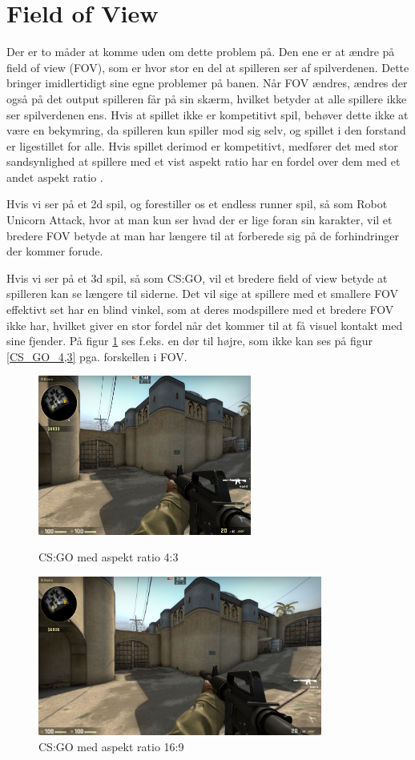 \documentclass[Main.tex]{AspectRatio.tex}
\begin{document}
\section{Field of View}

Der er to måder at komme uden om dette problem på. Den ene er at ændre på field of view (FOV), som er hvor stor en del at spilleren ser af spilverdenen. Dette bringer imidlertidigt sine egne problemer på banen. Når FOV ændres, ændres der også på det output spilleren får på sin skærm, hvilket betyder at alle spillere ikke ser spilverdenen ens. Hvis at spillet ikke er kompetitivt spil, behøver dette ikke at være en bekymring, da spilleren kun spiller mod sig selv, og spillet i den forstand er ligestillet for alle. Hvis spillet derimod er kompetitivt, medfører det med stor sandsynlighed at spillere med et vist aspekt ratio har en fordel over dem med et andet aspekt ratio \cite{Atwood}.

Hvis vi ser på et 2d spil, og forestiller os et endless runner spil, så som Robot Unicorn Attack, hvor at man kun ser hvad der er lige foran sin karakter, vil et bredere FOV betyde at man har længere til at forberede sig på de forhindringer der kommer forude.

Hvis vi ser på et 3d spil, så som CS:GO, vil et bredere field of view betyde at spilleren kan se længere til siderne. Det vil sige at spillere med et smallere FOV effektivt set har en blind vinkel, som at deres modspillere med et bredere FOV ikke har, hvilket giver en stor fordel når det kommer til at få visuel kontakt med sine fjender. På figur \ref{CS_GO_16,9} ses f.eks. en dør til højre, som ikke kan ses på figur \ref{CS_GO_4,3} pga. forskellen i FOV.
\clearpage


\begin{figure}[h]
\centering
\parbox{7cm}{
\includegraphics[width = 7cm]{billeder/CS_GO_4,3}
\caption{CS:GO med aspekt ratio 4:3}    
\label{CS_GO_4,3}}
\qquad
\begin{minipage}{9.33cm}
\includegraphics[width = 9.33cm]{billeder/CS_GO_16,9}
\caption{CS:GO med aspekt ratio 16:9}    
\label{CS_GO_16,9}
\end{minipage}
\end{figure} 
\end{document}
